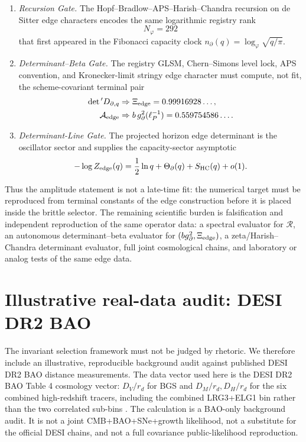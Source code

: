 \documentclass[aps,prd,reprint,nofootinbib,superscriptaddress,floatfix]{revtex4-2}
\numberwithin{equation}{section}
\theoremstyle{definition}
\theoremstyle{plain}
\begin{document}
\begin{enumerate}
\item \emph{Recursion Gate.}
The Hopf--Bradlow--APS--Harish--Chandra recursion on de Sitter edge characters
encodes the same logarithmic registry rank
\[
N_\varphi=292
\]
that first appeared in the Fibonacci capacity clock
\(n_\partial(q)=\log_\varphi\sqrt{q/\pi}\).

\item \emph{Determinant--Beta Gate.}
The registry GLSM, Chern--Simons level lock, APS convention, and
Kronecker-limit stringy edge character must compute, not fit, the
scheme-covariant terminal pair
\[
\begin{aligned}
\det{}'D_{\partial,q}
&\Rightarrow \Xi_{\rm edge}=0.99916928\ldots,\\
\mathcal A_{\rm edge}
&\Rightarrow b\,g_\partial^2(\ell_P^{-1})
=0.559754586\ldots .
\end{aligned}
\]

\item \emph{Determinant-Line Gate.}
The projected horizon edge determinant is the oscillator sector and supplies
the capacity-sector asymptotic
\[
-\log Z_{\rm edge}(q)
=
\frac12\ln q+\Theta_\partial(q)+S_{\rm HC}(q)+o(1).
\]
\end{enumerate}

Thus the amplitude statement is not a late-time fit: the numerical target must
be reproduced from terminal constants of the edge construction before it is
placed inside the brittle selector.  The remaining scientific burden is
falsification and independent reproduction of the same operator data:
a spectral evaluator for \(\mathcal R\), an autonomous determinant--beta
evaluator for \((b g_\partial^2,\Xi_{\rm edge})\), a zeta/Harish--Chandra
determinant evaluator, full joint cosmological chains, and laboratory or analog
tests of the same edge data.

\section{Illustrative real-data audit: DESI DR2 BAO}\label{sec:real-data-audit}

The invariant selection framework must not be judged by rhetoric.  We therefore include an illustrative, reproducible background audit against published DESI DR2 BAO distance measurements.  The data vector used here is the DESI DR2 BAO Table 4 cosmology vector: \(D_V/r_d\) for BGS and \(D_M/r_d,D_H/r_d\) for the six combined high-redshift tracers, including the combined LRG3+ELG1 bin rather than the two correlated sub-bins \cite{DESIDR2BAO2025}.  The calculation is a BAO-only background audit.  It is not a joint CMB+BAO+SNe+growth likelihood, not a substitute for the official DESI chains, and not a full covariance public-likelihood reproduction.
\end{document}
